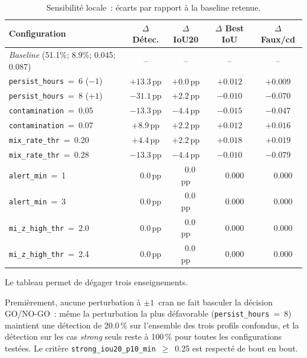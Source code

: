 \begin{table}[H]
    \centering
    \caption{Sensibilité locale~: écarts par rapport à la baseline retenue.}
    \label{tab:sensitivity_local}
    \small
    \begin{tabular}{lcccc}
        \toprule
        \textbf{Configuration} & \textbf{$\Delta$ Détec.} & \textbf{$\Delta$ IoU20}
            & \textbf{$\Delta$ Best IoU} & \textbf{$\Delta$ Faux/cd} \\
        \midrule
        \emph{Baseline} (51.1\%; 8.9\%; 0.045; 0.087) & --       & --       & --        & --       \\
        \midrule
        \texttt{persist\_hours}~=~6 ($-1$) & $+13.3$\,pp & $+0.0$\,pp & $+0.012$ & $+0.009$ \\
        \texttt{persist\_hours}~=~8 ($+1$) & $-31.1$\,pp & $+2.2$\,pp & $-0.010$ & $-0.070$ \\
        \texttt{contamination}~=~0.05      & $-13.3$\,pp & $-4.4$\,pp & $-0.015$ & $-0.047$ \\
        \texttt{contamination}~=~0.07      & $+8.9$\,pp  & $+2.2$\,pp & $+0.012$ & $+0.016$ \\
        \texttt{mix\_rate\_thr}~=~0.20     & $+4.4$\,pp  & $+2.2$\,pp & $+0.018$ & $+0.019$ \\
        \texttt{mix\_rate\_thr}~=~0.28     & $-13.3$\,pp & $-4.4$\,pp & $-0.010$ & $-0.079$ \\
        \texttt{alert\_min}~=~1            & $\phantom{+}0.0$\,pp & $\phantom{+}0.0$\,pp & $\phantom{+}0.000$ & $\phantom{+}0.000$ \\
        \texttt{alert\_min}~=~3            & $\phantom{+}0.0$\,pp & $\phantom{+}0.0$\,pp & $\phantom{+}0.000$ & $\phantom{+}0.000$ \\
        \texttt{mi\_z\_high\_thr}~=~2.0    & $\phantom{+}0.0$\,pp & $\phantom{+}0.0$\,pp & $\phantom{+}0.000$ & $\phantom{+}0.000$ \\
        \texttt{mi\_z\_high\_thr}~=~2.4    & $\phantom{+}0.0$\,pp & $\phantom{+}0.0$\,pp & $\phantom{+}0.000$ & $\phantom{+}0.000$ \\
        \bottomrule
    \end{tabular}
\end{table}

Le tableau permet de dégager trois enseignements.

Premièrement, aucune perturbation à $\pm 1$~cran ne fait basculer la décision GO/NO-GO~:
même la perturbation la plus défavorable (\texttt{persist\_hours}~=~8) maintient une
détection de 20.0\,\% sur l'ensemble des trois profils confondus, et la détection sur les
cas \textit{strong} seuls reste à 100\,\% pour toutes les configurations testées. Le critère
\texttt{strong\_iou20\_p10\_min}~$\geq$~0.25 est respecté de bout en bout.

